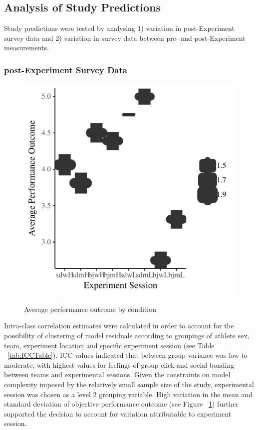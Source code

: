 \subsection{Analysis of Study Predictions}

Study predictions were tested by analysing 1) variation in post-Experiment survey data and 2) variation in survey data between pre- and post-Experiment measurements.



\subsubsection{post-Experiment Survey Data}


\begin{figure}
  \centering
  \includegraphics[width=0.5\linewidth,keepaspectratio] {images/fullOutcomeAvgSessionBoxplot-1}
  \label{fig:fullOutcomeAvgSessionBoxplot}
  \caption{Average performance outcome by condition}
\end{figure}




Intra-class correlation estimates were calculated in order to account for the possibility of clustering of model residuals according to groupings of athlete sex, team, experiment location and specific experiment session (see Table ~\ref{tab:ICCTable}). ICC values indicated that between-group variance was low to moderate, with highest values for feelings of group click and social bonding between teams and experimental sessions. Given the constraints on model complexity imposed by the relatively small sample size of the study, experimental session was chosen as a level 2 grouping variable. High variation in the mean and standard deviation of objective performance outcome (see Figure ~\ref{fig:fullOutcomeAvgSessionBoxplot}) further supported the decision to account for variation attributable to experiment session.

